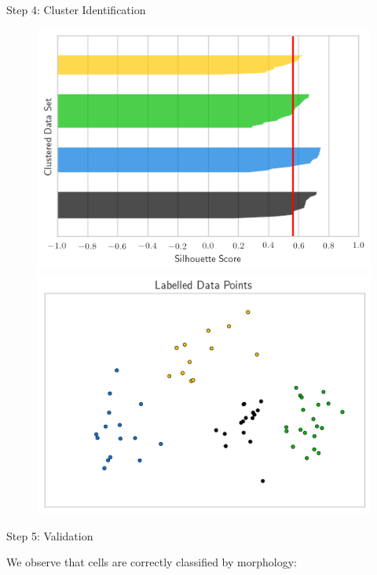 \documentclass[final,hyperref={pdfpagelabels=false}]{beamer}
\begin{document}
\begin{frame}[t]
\begin{columns}[t]
\begin{column}{.465\textwidth}
\begin{block}{Step 4: Cluster Identification}
\begin{figure}
\includegraphics[width=0.48\linewidth]{silhouette_fig1.png}
\hspace{0.5cm}
\includegraphics[width=0.48\linewidth]{silhouette_fig2.png}
\end{figure}

\end{block}


\begin{block}{Step 5: Validation}

We observe that cells are correctly classified by morphology:
\vspace{0.5em}

\begin{columns}


\end{columns}
\end{block}
\end{column}
\end{columns}
\end{frame}
\end{document}
